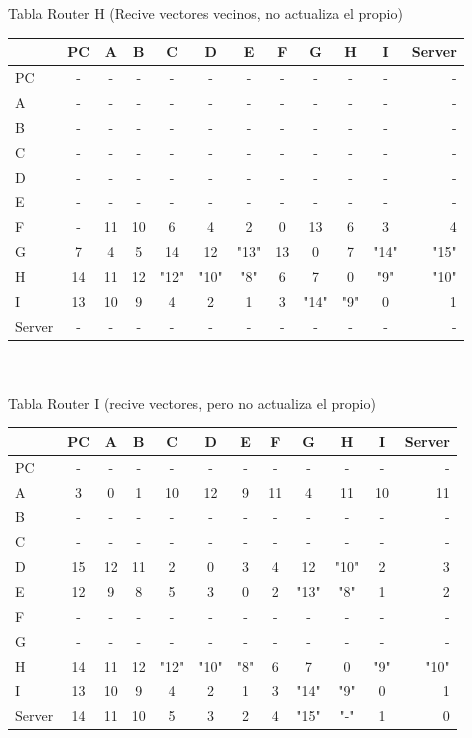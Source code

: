 \documentclass{article}
\begin{document}
\\
\\
Tabla Router H (Recive vectores vecinos, no actualiza el propio) \\
\begin{tabular}{l*{10}{c}r}
              & PC & A & B & C & D & E & F & G & H & I & Server \\
\hline
PC             & - & - & - & - & - & - & - & - & - & - & - \\
A              & - & - & - & - & - & - & - & - & - & - & - \\
B              & - & - & - & - & - & - & - & - & - & - & - \\
C              & - & - & - & - & - & - & - & - & - & - & - \\
D              & - & - & - & - & - & - & - & - & - & - & - \\
E              & - & - & - & - & - & - & - & - & - & - & - \\
F              & - & 11 & 10 & 6 & 4 & 2 & 0 & 13 & 6 & 3 & 4\\
G              & 7 & 4 & 5 & 14 & 12 & "13" & 13 & 0 & 7 & "14" & "15"\\
H              & 14 & 11 & 12 & "12" & "10" & "8" & 6 & 7 & 0 & "9" & "10"\\
I              & 13 & 10 & 9 & 4 & 2 & 1 & 3 & "14" & "9" & 0 & 1\\
Server         & - & - & - & - & - & - & - & - & - & - & - \\

\end{tabular}
\\
\\
Tabla Router I (recive vectores, pero no actualiza el propio)\\
\begin{tabular}{l*{10}{c}r}
              & PC & A & B & C & D & E & F & G & H & I & Server \\
\hline
PC             & - & - & - & - & - & - & - & - & - & - & -\\
A              & 3 & 0 & 1 & 10 & 12 & 9 & 11 & 4 & 11 & 10 & 11 \\
B              & - & - & - & - & - & - & - & - & - & - & -\\
C              & - & - & - & - & - & - & - & - & - & - & -\\
D              & 15 & 12 & 11 & 2 & 0 & 3 & 4 & 12 & "10" & 2 & 3\\
E              & 12 & 9 & 8 & 5 & 3 & 0 & 2 & "13" & "8" & 1 & 2\\
F              & - & - & - & - & - & - & - & - & - & - & -\\
G              & - & - & - & - & - & - & - & - & - & - & -\\
H              & 14 & 11 & 12 & "12" & "10" & "8" & 6 & 7 & 0 & "9" & "10"\\
I              & 13 & 10 & 9 & 4 & 2 & 1 & 3 & "14" & "9" & 0 & 1\\
Server         & 14 & 11 & 10 & 5 & 3 & 2 & 4 & "15" & "-" & 1 & 0\\

\end{tabular}
\\
\end{document}
